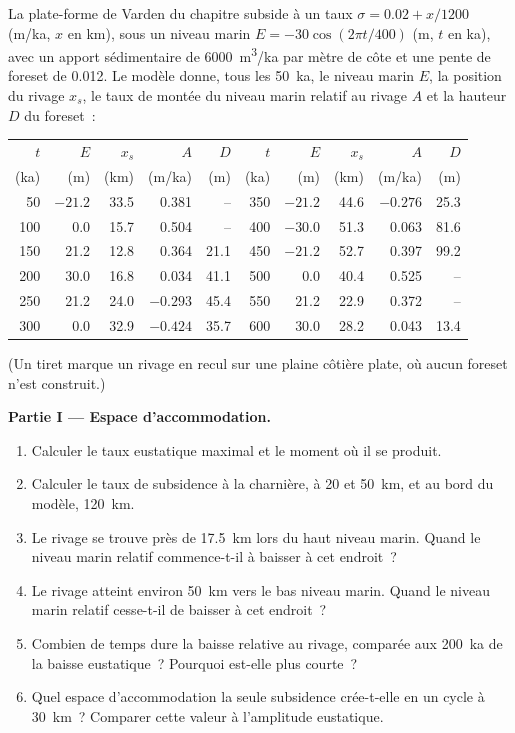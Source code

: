 \begin{problem}
\label{pb:b3:sequence-stratigraphy:1}
La plate-forme de Varden du chapitre subside à un taux $\sigma = 0.02 + x/1200$
(\unit{m/ka}, $x$ en km), sous un niveau marin $E = -30\cos(2\pi t/400)$ (m,
$t$ en ka), avec un apport sédimentaire de \qty{6000}{m^3/ka} par mètre de côte et une
pente de foreset de 0.012. Le modèle donne, tous les \qty{50}{ka}, le niveau marin
$E$, la position du rivage $x_s$, le taux de montée du niveau marin relatif au
rivage $A$ et la hauteur $D$ du foreset~:

\begin{center}\small
\begin{tabular}{rrrrr|rrrrr}
$t$ & $E$ & $x_s$ & $A$ & $D$ & $t$ & $E$ & $x_s$ & $A$ & $D$\\
(ka) & (m) & (km) & (m/ka) & (m) & (ka) & (m) & (km) & (m/ka) & (m)\\\hline
50 & $-21.2$ & 33.5 & 0.381 & -- & 350 & $-21.2$ & 44.6 & $-0.276$ & 25.3\\
100 & 0.0 & 15.7 & 0.504 & -- & 400 & $-30.0$ & 51.3 & 0.063 & 81.6\\
150 & 21.2 & 12.8 & 0.364 & 21.1 & 450 & $-21.2$ & 52.7 & 0.397 & 99.2\\
200 & 30.0 & 16.8 & 0.034 & 41.1 & 500 & 0.0 & 40.4 & 0.525 & --\\
250 & 21.2 & 24.0 & $-0.293$ & 45.4 & 550 & 21.2 & 22.9 & 0.372 & --\\
300 & 0.0 & 32.9 & $-0.424$ & 35.7 & 600 & 30.0 & 28.2 & 0.043 & 13.4\\
\end{tabular}
\end{center}
(Un tiret marque un rivage en recul sur une plaine côtière plate, où aucun
foreset n'est construit.)

\medskip\noindent\textbf{Partie I --- Espace d'accommodation.}
\begin{enumerate}
\item Calculer le taux eustatique maximal et le moment où il se produit.
\item Calculer le taux de subsidence à la charnière, à 20 et \qty{50}{km}, et
  au bord du modèle, \qty{120}{km}.
\item Le rivage se trouve près de \qty{17.5}{km} lors du haut niveau marin. Quand le
  niveau marin relatif commence-t-il à baisser à cet endroit~?
\item Le rivage atteint environ \qty{50}{km} vers le bas niveau marin. Quand le
  niveau marin relatif cesse-t-il de baisser à cet endroit~?
\item Combien de temps dure la baisse relative au rivage, comparée aux
  \qty{200}{ka} de la baisse eustatique~? Pourquoi est-elle plus courte~?
\item Quel espace d'accommodation la seule subsidence crée-t-elle en un cycle à
  \qty{30}{km}~? Comparer cette valeur à l'amplitude eustatique.
\end{enumerate}


\end{problem}
